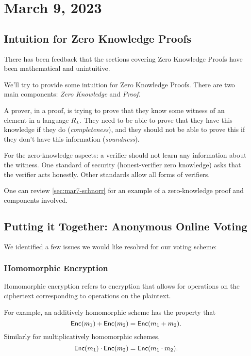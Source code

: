 \section{March 9, 2023}
\label{20230309}
\subsection{Intuition for Zero Knowledge Proofs}
There has been feedback that the sections covering Zero Knowledge Proofs have been mathematical and unintuitive.

We'll try to provide some intuition for Zero Knowledge Proofs. There are two main components: \emph{Zero Knowledge} and \emph{Proof}.

A prover, in a proof, is trying to prove that they know some witness of an element in a language $R_L$. They need to be able to prove that they have this knowledge if they do (\emph{completeness}), and they should not be able to prove this if they don't have this information (\emph{soundness}).

For the zero-knowledge aspects: a verifier should not learn any information about the witness. One standard of security (honest-verifier zero knowledge) asks that the verifier acts honestly. Other standards allow all forms of verifiers.

One can review \cref{sec:mar7-schnorr} for an example of a zero-knowledge proof and components involved.

\subsection{Putting it Together: Anonymous Online Voting}
We identified a few issues we would like resolved for our voting scheme:

\subsubsection{Homomorphic Encryption}
Homomorphic encryption refers to encryption that allows for operations on the ciphertext corresponding to operations on the plaintext.

For example, an additively homomorphic scheme has the property that
\[\operatorname{\mathsf{Enc}}(m_1) + \operatorname{\mathsf{Enc}}(m_2) = \operatorname{\mathsf{Enc}}(m_1 + m_2).\]
Similarly for multiplicatively homomorphic schemes,
\[\operatorname{\mathsf{Enc}}(m_1) \cdot \operatorname{\mathsf{Enc}}(m_2) = \operatorname{\mathsf{Enc}}(m_1 \cdot m_2).\]

